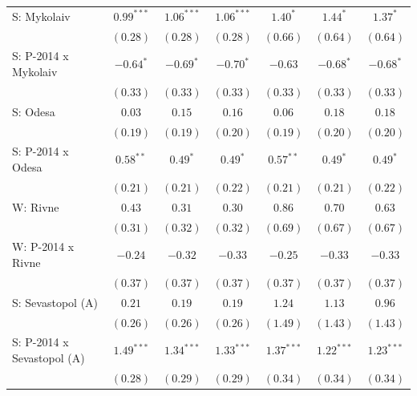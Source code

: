 \begin{table}
\begin{center}
\begin{small}
\begin{tabular}{l c c c c c c}
S: Mykolaiv                 & $0.99^{***}$  & $1.06^{***}$  & $1.06^{***}$  & $1.40^{*}$   & $1.44^{*}$   & $1.37^{*}$   \\
                            & $(0.28)$      & $(0.28)$      & $(0.28)$      & $(0.66)$     & $(0.64)$     & $(0.64)$     \\
S: P-2014 x Mykolaiv        & $-0.64^{*}$   & $-0.69^{*}$   & $-0.70^{*}$   & $-0.63$      & $-0.68^{*}$  & $-0.68^{*}$  \\
                            & $(0.33)$      & $(0.33)$      & $(0.33)$      & $(0.33)$     & $(0.33)$     & $(0.33)$     \\
S: Odesa                    & $0.03$        & $0.15$        & $0.16$        & $0.06$       & $0.18$       & $0.18$       \\
                            & $(0.19)$      & $(0.19)$      & $(0.20)$      & $(0.19)$     & $(0.20)$     & $(0.20)$     \\
S: P-2014 x Odesa           & $0.58^{**}$   & $0.49^{*}$    & $0.49^{*}$    & $0.57^{**}$  & $0.49^{*}$   & $0.49^{*}$   \\
                            & $(0.21)$      & $(0.21)$      & $(0.22)$      & $(0.21)$     & $(0.21)$     & $(0.22)$     \\
W: Rivne                    & $0.43$        & $0.31$        & $0.30$        & $0.86$       & $0.70$       & $0.63$       \\
                            & $(0.31)$      & $(0.32)$      & $(0.32)$      & $(0.69)$     & $(0.67)$     & $(0.67)$     \\
W: P-2014 x Rivne           & $-0.24$       & $-0.32$       & $-0.33$       & $-0.25$      & $-0.33$      & $-0.33$      \\
                            & $(0.37)$      & $(0.37)$      & $(0.37)$      & $(0.37)$     & $(0.37)$     & $(0.37)$     \\
S: Sevastopol (A)           & $0.21$        & $0.19$        & $0.19$        & $1.24$       & $1.13$       & $0.96$       \\
                            & $(0.26)$      & $(0.26)$      & $(0.26)$      & $(1.49)$     & $(1.43)$     & $(1.43)$     \\
S: P-2014 x Sevastopol (A)  & $1.49^{***}$  & $1.34^{***}$  & $1.33^{***}$  & $1.37^{***}$ & $1.22^{***}$ & $1.23^{***}$ \\
                            & $(0.28)$      & $(0.29)$      & $(0.29)$      & $(0.34)$     & $(0.34)$     & $(0.34)$     \\

\end{tabular}
\end{small}
\end{center}
\end{table}
